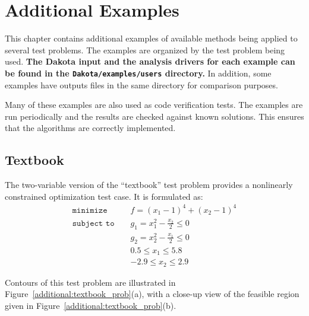 \chapter{Additional Examples}\label{additional}

This chapter contains additional examples of available methods being applied 
to several test problems. The examples are organized by the test problem
being used. {\bf The Dakota input and the analysis drivers 
for each example can be found in the {\tt Dakota/examples/users} directory.}
In addition, some examples have outputs files in the same directory for
comparison purposes.

Many of these examples are also used as code verification tests. The examples are
run periodically and the results are checked against known solutions. This 
ensures that the algorithms are correctly implemented. 

\section{Textbook}\label{additional:textbook}

The two-variable version of the ``textbook'' test problem provides
a nonlinearly constrained optimization test case. It is formulated as:
\begin{eqnarray}
\texttt{minimize }
& & f = (x_1-1)^{4}+(x_2-1)^{4}     \nonumber \\
\texttt{subject to }
& & g_1 = x_1^2-\frac{x_2}{2} \le 0 \nonumber \\
& & g_2 = x_2^2-\frac{x_1}{2} \le 0 \label{additional:textbook_f} \\
& &  0.5 \le x_1 \le 5.8            \nonumber \\
& & -2.9 \le x_2 \le 2.9            \nonumber
\end{eqnarray}

Contours of this test problem are illustrated in
Figure~\ref{additional:textbook_prob}(a), with a close-up view of
the feasible region given in
Figure~\ref{additional:textbook_prob}(b).

